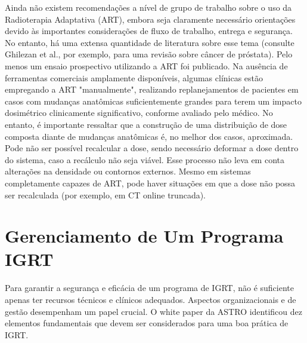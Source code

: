 \documentclass[11pt,a4paper]{article}
\newcounter{exemplo}
\begin{document}
	Ainda não existem recomendações a nível de grupo de trabalho sobre o uso da Radioterapia Adaptativa (ART), embora seja claramente necessário orientações devido às importantes considerações de fluxo de trabalho, entrega e segurança. No entanto, há uma extensa quantidade de literatura sobre esse tema (consulte Ghilezan et al., por exemplo, para uma revisão sobre câncer de próstata). Pelo menos um ensaio prospectivo utilizando a ART foi publicado. Na ausência de ferramentas comerciais amplamente disponíveis, algumas clínicas estão empregando a ART "manualmente", realizando replanejamentos de pacientes em casos com mudanças anatômicas suficientemente grandes para terem um impacto dosimétrico clinicamente significativo, conforme avaliado pelo médico. No entanto, é importante ressaltar que a construção de uma distribuição de dose composta diante de mudanças anatômicas é, no melhor dos casos, aproximada. Pode não ser possível recalcular a dose, sendo necessário deformar a dose dentro do sistema, caso a recálculo não seja viável. Esse processo não leva em conta alterações na densidade ou contornos externos. Mesmo em sistemas completamente capazes de ART, pode haver situações em que a dose não possa ser recalculada (por exemplo, em CT online truncada). 


\section{Gerenciamento de Um Programa IGRT}

	Para garantir a segurança e eficácia de um programa de IGRT, não é suficiente apenas ter recursos técnicos e clínicos adequados. Aspectos organizacionais e de gestão desempenham um papel crucial. O white paper da ASTRO identificou dez elementos fundamentais que devem ser considerados para uma boa prática de IGRT.
\end{document}
